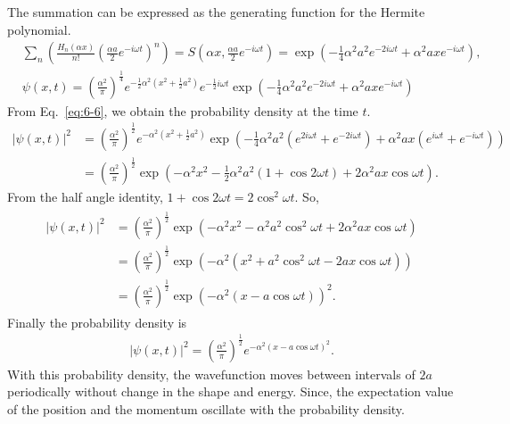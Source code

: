 \documentclass[floatfix,nofootinbib,superscriptaddress,fleqn]{revtex4-2}
\begin{document}
The summation can be expressed as the generating function for the Hermite polynomial.
\begin{align}
  &\sum_n\left(\frac{H_n(\alpha x)}{n!}
  \left( \frac{\alpha a}{2}e^{-i\omega t} \right)^n
  \right) = S\left(\alpha x,\frac{\alpha a}{2}
  e^{-i\omega t}\right)
  =\exp{\left(-\frac{1}{4}\alpha^2 a^2e^{-2i\omega t}+\alpha^2ax
  e^{-i\omega t}\right)},  \\
  \label{eq:6-6}&\psi(x,t)
  =\left(\frac{\alpha^2}{\pi}\right)
  ^{\frac{1}{4}}
  e^{-\frac{1}{2}\alpha^2
  \left(x^2+\frac{1}{2}a^2\right)}
  e^{-\frac{1}{2}i\omega t}
  \exp{\left(-\frac{1}{4}\alpha^2 
  a^2e^{-2i\omega t}
  +\alpha^2axe^{-i\omega t}\right)}
\end{align}
From Eq.~\eqref{eq:6-6}, we obtain the probability density at the time $t$.
\begin{align}
    |\psi(x,t)|^2
    &=\left(\frac{\alpha^2}{\pi}\right)^{\frac{1}{2}}
    e^{-\alpha^2\left(x^2+\frac{1}{2}a^2\right)}
    \exp{\left(-\frac{1}{4}\alpha^2 a^2
    (e^{2i\omega t}+e^{-2i\omega t})
    +\alpha^2ax(e^{i\omega t}+e^{-i\omega t})\right)} \\
    &=\left(\frac{\alpha^2}{\pi}\right)^{\frac{1}{2}}
    \exp{\left(-\alpha^2x^2
    -\frac{1}{2}\alpha^2 a^2
    (1+\cos{2\omega t})
    +2\alpha^2ax\cos{\omega t}\right)}.
\end{align}
From the half angle identity,
$1+\cos{2\omega t}=2\cos^2{\omega t}$. So,
\begin{align}
  \begin{split}
    |\psi(x,t)|^2&=\left(\frac{\alpha^2}{\pi}\right)^{\frac{1}{2}}
    \exp{\left(-\alpha^2x^2
    -\alpha^2 a^2\cos^2{\omega t}
    +2\alpha^2ax\cos{\omega t}\right)}  \\
    &=\left(\frac{\alpha^2}{\pi}\right)^{\frac{1}{2}}
    \exp{\left(-\alpha^2(x^2
    +a^2\cos^2{\omega t}
    -2ax\cos{\omega t})\right)} \\
    &=\left(\frac{\alpha^2}{\pi}\right)^{\frac{1}{2}}
    \exp{\left(-\alpha^2(x
    -a\cos{\omega t})\right)^2}.
  \end{split}
\end{align}
Finally the probability density is
\begin{align}
  |\psi(x,t)|^2
  =\left(\frac{\alpha^2}{\pi}\right)^{\frac{1}{2}}
  e^{-\alpha^2(x-a\cos{\omega t})^2} .
\end{align}
With this probability density, the wavefunction moves between 
intervals of $2a$ periodically without change in the shape and energy.
Since, the expectation value of the position and the momentum oscillate 
with the probability density.
\vspace{1cm}
\end{document}
